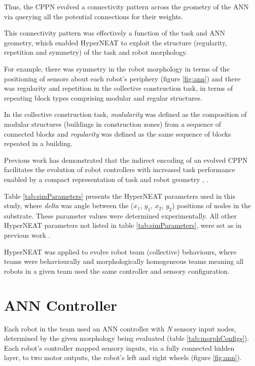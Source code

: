 Thus, the CPPN evolved a connectivity pattern across the geometry of the ANN via querying all the potential
connections for their weights.

This connectivity pattern was effectively a function of the task and ANN geometry,
which enabled HyperNEAT to exploit the structure (regularity, repetition and symmetry) of the task and robot morphology.

For example, there was symmetry in the robot morphology in terms of the positioning of sensors about each
robot's periphery (figure \ref{fig:ann}) and there was regularity and repetition in the collective construction
task, in terms of repeating block types comprising modular and regular structures.

In the collective construction task, \textit{modularity} was defined as the composition of modular structures
(buildings in construction zones) from a sequence of connected blocks and \textit{regularity} was defined
as the same sequence of blocks repeated in a building.

Previous work has demonstrated that the indirect encoding of an evolved CPPN facilitates the evolution of
robot controllers with increased task performance enabled by a compact representation
of task and robot geometry \cite{DAmbrosioStanley2008}, \cite{WatsonNitschke2015SSCI}.

Table \ref{tab:simParameters} presents the HyperNEAT parameters used in this study, where \textit{delta}
was angle between the ($x_{1}$, $y_{1}$, $x_{2}$, $y_{2}$) positions of nodes in the substrate.
These parameter values were determined experimentally.   All other HyperNEAT parameters not listed in
table \ref{tab:simParameters}, were set as in previous work \cite{DAmbrosioStanley2008}.



HyperNEAT was applied to evolve robot team (collective) behaviours, where teams were behaviourally and morphologically homogeneous teams meaning all robots in a given team used the same controller and sensory configuration.

\section{ANN Controller}

Each robot in the team used an ANN controller with
\textit{N} sensory input nodes, determined by the given morphology being evaluated (table \ref{tab:morphConfigs}).
Each robot's controller mapped sensory inputs, via a fully connected hidden layer, to two motor outputs, the
robot's left and right wheels (figure \ref{fig:ann}). %

